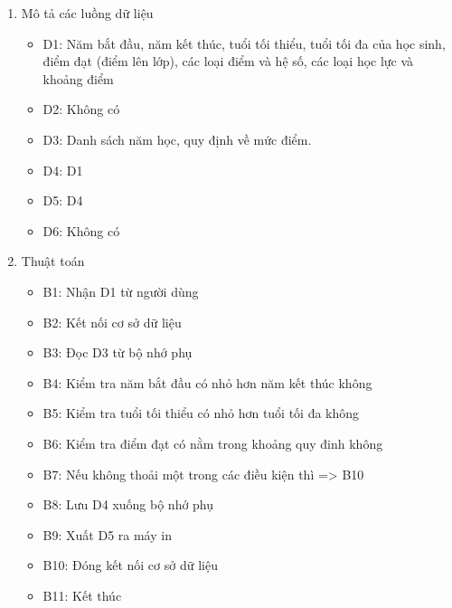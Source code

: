 \documentclass[a4paper]{article}
\begin{document}
\begin{enumerate}
\item Mô tả các luồng dữ liệu
\begin{itemize}
\item D1: Năm bắt đầu, năm kết thúc, tuổi tối thiểu, tuổi tối đa của học sinh, điểm đạt (điểm lên lớp), các loại điểm và hệ số, các loại học lực và khoảng điểm
\item D2: Không có
\item D3: Danh sách năm học, quy định về mức điểm.
\item D4: D1
\item D5: D4
\item D6: Không có
\end{itemize}
\item Thuật toán
\begin{itemize}
\item B1: Nhận D1 từ người dùng
\item B2: Kết nối cơ sở dữ liệu
\item B3: Đọc D3 từ bộ nhớ phụ
\item B4: Kiểm tra năm bắt đầu có nhỏ hơn năm kết thúc không
\item B5: Kiểm tra tuổi tối thiểu có nhỏ hơn tuổi tối đa không
\item B6: Kiểm tra điểm đạt có nằm trong khoảng quy đinh không
\item B7: Nếu không thoải một trong các điều kiện thì => B10
\item B8: Lưu D4 xuống bộ nhớ phụ
\item B9: Xuất D5 ra máy in
\item B10: Đóng kết nối cơ sở dữ liệu
\item B11: Kết thúc
\end{itemize}
\end{enumerate}		
		
		
		
\end{document}
